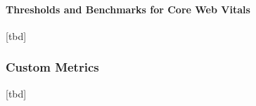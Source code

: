 









\paragraph{Thresholds and Benchmarks for Core Web Vitals}


[tbd]




































\subsubsection{Custom Metrics}


[tbd]


